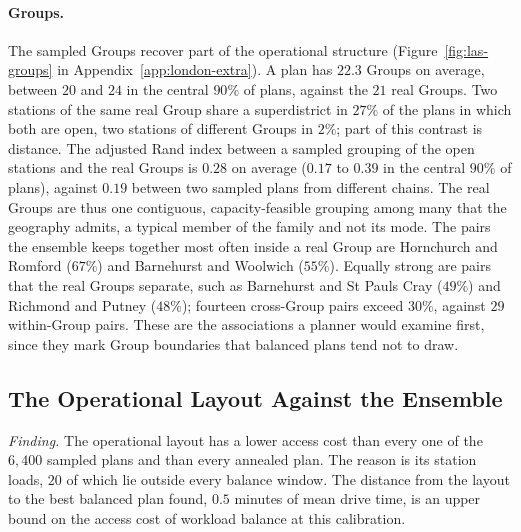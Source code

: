 \documentclass[11pt]{article}
\theoremstyle{definition}
\begin{document}
\paragraph{Groups.}
The sampled Groups recover part of the operational structure (Figure~\ref{fig:las-groups} in Appendix~\ref{app:london-extra}). A plan has $22.3$ Groups on average, between $20$ and $24$ in the central $90\%$ of plans, against the $21$ real Groups. Two stations of the same real Group share a superdistrict in $27\%$ of the plans in which both are open, two stations of different Groups in $2\%$; part of this contrast is distance. The adjusted Rand index between a sampled grouping of the open stations and the real Groups is $0.28$ on average ($0.17$ to $0.39$ in the central $90\%$ of plans), against $0.19$ between two sampled plans from different chains. The real Groups are thus one contiguous, capacity-feasible grouping among many that the geography admits, a typical member of the family and not its mode. The pairs the ensemble keeps together most often inside a real Group are Hornchurch and Romford ($67\%$) and Barnehurst and Woolwich ($55\%$). Equally strong are pairs that the real Groups separate, such as Barnehurst and St Pauls Cray ($49\%$) and Richmond and Putney ($48\%$); fourteen cross-Group pairs exceed $30\%$, against $29$ within-Group pairs. These are the associations a planner would examine first, since they mark Group boundaries that balanced plans tend not to draw.

\subsection{The Operational Layout Against the Ensemble}\label{sec:las-price}

\emph{Finding.} The operational layout has a lower access cost than every one of the $6{,}400$ sampled plans and than every annealed plan. The reason is its station loads, $20$ of which lie outside every balance window. The distance from the layout to the best balanced plan found, $0.5$ minutes of mean drive time, is an upper bound on the access cost of workload balance at this calibration.

\begin{table}[!htbp]
\centering
\small

\caption{The operational layout against balanced plans, on the station leg. ``Best sampled plan'' is the stored plan with the lowest station-leg energy; ``best annealed plan'' is the best of eight annealing runs of $50{,}000$ steps. The last row is the upper bound on the access cost of workload balance.}
\label{tab:las-layout}
\end{table}
\end{document}
